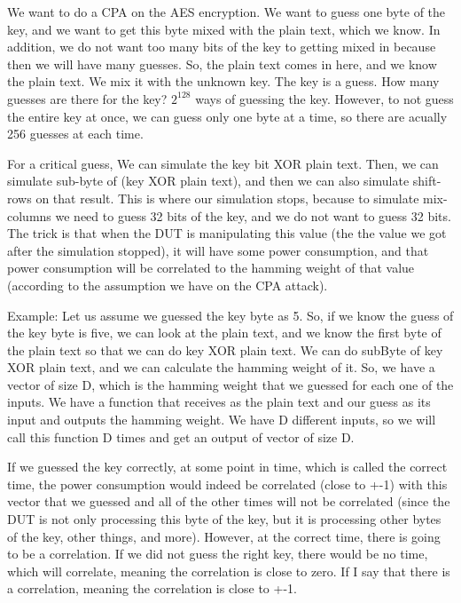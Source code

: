 We want to do a CPA on the AES encryption. We want to guess one byte of the key, and we want to get this byte mixed with the plain text, which we know. In addition, we
do not want too many bits of the key to getting mixed in because then we will have many guesses. So, the plain text comes in here, and we know the plain text. We
mix it with the unknown key. The key is a guess. How many guesses are there for
the key?  $2^{128}$ ways of guessing the key. However, to not guess the
entire key at once, we can guess only one byte at a time, so there are acually
256 guesses at each time. 

For a critical guess, We can simulate the key bit XOR plain text. Then, we can
simulate sub-byte of (key XOR plain text), and then we can also simulate
shift-rows on that result. This is where our simulation stops, because to
simulate mix-columns we need to guess 32 bits of the key, and we do not want to
guess 32 bits. The trick is that when the DUT is manipulating this value (the
the value we got after the simulation stopped), it will have some power consumption,
and that power consumption will be correlated to the hamming weight of that
value (according to the assumption we have on the CPA attack). 

Example: Let us assume we guessed the key byte as 5. So, if we know the guess of
the key byte is five, we can look at the plain text, and we know the first byte of
the plain text so that we can do key XOR plain text. We can do subByte of key XOR
plain text, and we can calculate the hamming weight of it. So, we have a vector
of size D, which is the hamming weight that we guessed for each one of the
inputs. We have a function that receives as the plain text and our guess as its input
and outputs the hamming weight. We have D different inputs, so we will call this
function D times and get an output of vector of size D. 

If we guessed the key correctly, at some point in time, which is called the
correct time, the power consumption would indeed be correlated (close to +-1)
with this vector that we guessed and all of the other times will not be
correlated (since the DUT is not only processing this byte of the key, but it is
processing other bytes of the key, other things, and more). However, at the correct
time, there is going to be a correlation. If we did not guess the right key,
there would be no time, which will correlate, meaning the correlation is
close to zero. If I say that there is a correlation, meaning the correlation is
close to +-1. 

